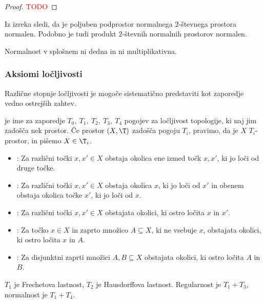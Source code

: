 \begin{proof}
    \textcolor{red}{TODO}
\end{proof}

\begin{opomba}
    Iz izreka sledi, da je poljuben podprostor normalnega $2$-števnega prostora normalen. Podobno je tudi produkt $2$-števnih normalnih prostorov normalen.
\end{opomba}

\begin{opomba}
    Normalnost v splošnem ni dedna in ni multiplikativna.
\end{opomba}

\subsubsection{Aksiomi ločljivosti}
Različne stopnje ločljivosti je mogoče sistematično predstaviti kot zaporedje vedno ostrejših zahtev.

\begin{definicija}
     je ime za zaporedje $T_0, \ T_1, \  T_2,\ T_3,\ T_4$ pogojev za ločljivost topologije, ki naj jim zadošča nek prostor. Če prostor $(X, \T)$ zadošča pogoju $T_i$, pravimo, da je $X$ $T_i$-prostor, in pišemo $X \in \T_i$.
\end{definicija}


\begin{itemize}
    \item [] : Za različni točki $x, x' \in X$ obstaja okolica ene izmed točk $x, x'$, ki jo loči od druge točke.
    \item [] : Za različni točki $x, x' \in X$ obstaja okolica $x$, ki jo loči od $x'$ in obenem obstaja okolica točke $x'$, ki jo loči od $x$.
    \item [] : Za različni točki $x, x' \in X$ obstajata okolici, ki ostro ločita $x$ in $x'$.
    \item [] : Za točko $x \in X$ in zaprto množico $A \subseteq X$, ki ne vsebuje $x$, obstajata okolici, ki ostro ločita $x$ in $A$.
    \item [] : Za disjunktni zaprti množici $A, B \subseteq X$ obstajata okolici, ki ostro ločita $A$ in $B$.
\end{itemize}

\begin{opomba}
    $T_1$ je Frechetova lastnost, $T_2$ je Hausdorffova lastnost. Regularnost je $T_1 + T_3$, normalnost je $T_1 + T_4$.
\end{opomba}

